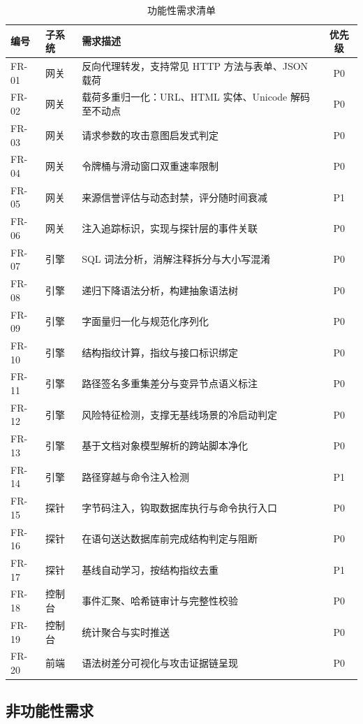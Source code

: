 \begin{table}[htbp]
\centering
\caption{功能性需求清单}
\label{tab:functional-req}
\footnotesize
\begin{tabular}{@{}l l p{7.0cm} c@{}}
\toprule
\textbf{编号} & \textbf{子系统} & \textbf{需求描述} & \textbf{优先级} \\
\midrule
FR-01 & 网关 & 反向代理转发，支持常见 HTTP 方法与表单、JSON 载荷 & P0 \\
FR-02 & 网关 & 载荷多重归一化：URL、HTML 实体、Unicode 解码至不动点 & P0 \\
FR-03 & 网关 & 请求参数的攻击意图启发式判定 & P0 \\
FR-04 & 网关 & 令牌桶与滑动窗口双重速率限制 & P0 \\
FR-05 & 网关 & 来源信誉评估与动态封禁，评分随时间衰减 & P1 \\
FR-06 & 网关 & 注入追踪标识，实现与探针层的事件关联 & P0 \\
\midrule
FR-07 & 引擎 & SQL 词法分析，消解注释拆分与大小写混淆 & P0 \\
FR-08 & 引擎 & 递归下降语法分析，构建抽象语法树 & P0 \\
FR-09 & 引擎 & 字面量归一化与规范化序列化 & P0 \\
FR-10 & 引擎 & 结构指纹计算，指纹与接口标识绑定 & P0 \\
FR-11 & 引擎 & 路径签名多重集差分与变异节点语义标注 & P0 \\
FR-12 & 引擎 & 风险特征检测，支撑无基线场景的冷启动判定 & P0 \\
FR-13 & 引擎 & 基于文档对象模型解析的跨站脚本净化 & P0 \\
FR-14 & 引擎 & 路径穿越与命令注入检测 & P1 \\
\midrule
FR-15 & 探针 & 字节码注入，钩取数据库执行与命令执行入口 & P0 \\
FR-16 & 探针 & 在语句送达数据库前完成结构判定与阻断 & P0 \\
FR-17 & 探针 & 基线自动学习，按结构指纹去重 & P1 \\
\midrule
FR-18 & 控制台 & 事件汇聚、哈希链审计与完整性校验 & P0 \\
FR-19 & 控制台 & 统计聚合与实时推送 & P0 \\
FR-20 & 前端 & 语法树差分可视化与攻击证据链呈现 & P0 \\
\bottomrule
\end{tabular}
\end{table}

\subsection{非功能性需求}

